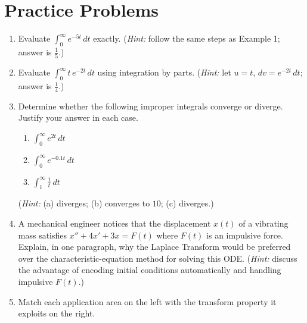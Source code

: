 \documentclass[12pt,a4paper]{article}
\begin{document}
\section{Practice Problems}

\begin{enumerate}[label=\textbf{P\arabic*.}, leftmargin=*, itemsep=6pt]

  \item Evaluate $\displaystyle\int_0^\infty e^{-5t}\,dt$ exactly.
        (\textit{Hint:} follow the same steps as Example 1; answer is
        $\frac{1}{5}$.)

  \item Evaluate $\displaystyle\int_0^\infty t\,e^{-2t}\,dt$ using integration
        by parts.
        (\textit{Hint:} let $u = t$, $dv = e^{-2t}\,dt$; answer is
        $\frac{1}{4}$.)

  \item Determine whether the following improper integrals converge or
        diverge. Justify your answer in each case.
        \begin{enumerate}[label=(\alph*)]
          \item $\displaystyle\int_0^\infty e^{2t}\,dt$
          \item $\displaystyle\int_0^\infty e^{-0.1t}\,dt$
          \item $\displaystyle\int_1^\infty \frac{1}{t}\,dt$
        \end{enumerate}
        (\textit{Hint:} (a) diverges; (b) converges to $10$; (c) diverges.)

  \item A mechanical engineer notices that the displacement $x(t)$ of a
        vibrating mass satisfies $x'' + 4x' + 3x = F(t)$ where $F(t)$ is
        an impulsive force.  Explain, in one paragraph, why the Laplace
        Transform would be preferred over the characteristic-equation method
        for solving this ODE.
        (\textit{Hint:} discuss the advantage of encoding initial conditions
        automatically and handling impulsive $F(t)$.)

  \item Match each application area on the left with the transform property
        it exploits on the right.


\end{enumerate}
\end{document}
